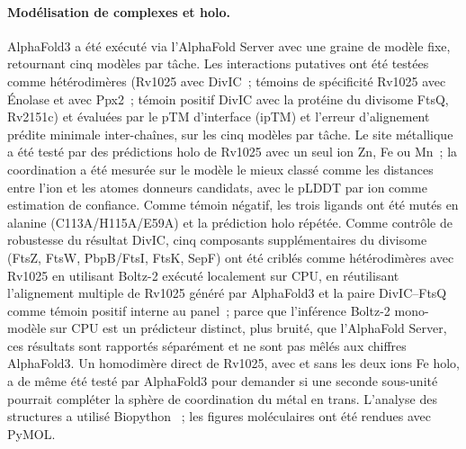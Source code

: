 \documentclass[11pt,a4paper]{article}
\begin{document}
\paragraph{Modélisation de complexes et holo.} AlphaFold3 \citep{abramson2024alphafold3} a été exécuté via l'AlphaFold Server avec une graine de modèle fixe, retournant cinq modèles par tâche. Les interactions putatives ont été testées comme hétérodimères (Rv1025 avec DivIC~; témoins de spécificité Rv1025 avec Énolase et avec Ppx2~; témoin positif DivIC avec la protéine du divisome FtsQ, Rv2151c) et évaluées par le pTM d'interface (ipTM) et l'erreur d'alignement prédite minimale inter-chaînes, sur les cinq modèles par tâche. Le site métallique a été testé par des prédictions holo de Rv1025 avec un seul ion Zn, Fe ou Mn~; la coordination a été mesurée sur le modèle le mieux classé comme les distances entre l'ion et les atomes donneurs candidats, avec le pLDDT par ion comme estimation de confiance. Comme témoin négatif, les trois ligands ont été mutés en alanine (C113A/H115A/E59A) et la prédiction holo répétée. Comme contrôle de robustesse du résultat DivIC, cinq composants supplémentaires du divisome (FtsZ, FtsW, PbpB/FtsI, FtsK, SepF) ont été criblés comme hétérodimères avec Rv1025 en utilisant Boltz-2 \citep{passaro2025boltz2} exécuté localement sur CPU, en réutilisant l'alignement multiple de Rv1025 généré par AlphaFold3 et la paire DivIC--FtsQ comme témoin positif interne au panel~; parce que l'inférence Boltz-2 mono-modèle sur CPU est un prédicteur distinct, plus bruité, que l'AlphaFold Server, ces résultats sont rapportés séparément et ne sont pas mêlés aux chiffres AlphaFold3. Un homodimère direct de Rv1025, avec et sans les deux ions Fe holo, a de même été testé par AlphaFold3 pour demander si une seconde sous-unité pourrait compléter la sphère de coordination du métal en trans. L'analyse des structures a utilisé Biopython \citep{cock2009biopython}~; les figures moléculaires ont été rendues avec PyMOL.
\end{document}
